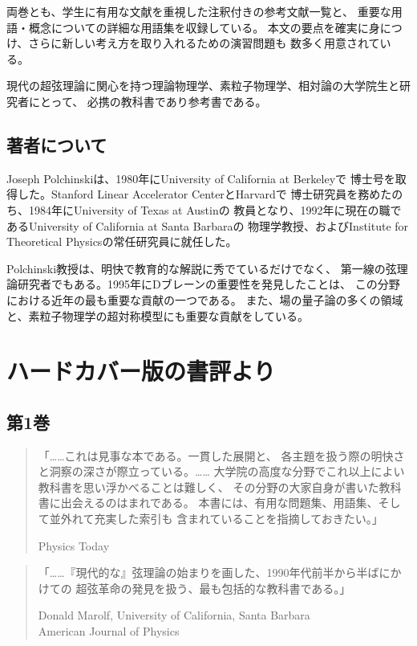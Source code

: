 両巻とも、学生に有用な文献を重視した注釈付きの参考文献一覧と、
重要な用語・概念についての詳細な用語集を収録している。
本文の要点を確実に身につけ、さらに新しい考え方を取り入れるための演習問題も
数多く用意されている。

現代の超弦理論に関心を持つ理論物理学、素粒子物理学、相対論の大学院生と研究者にとって、
必携の教科書であり参考書である。

\subsection*{著者について}
Joseph Polchinskiは、1980年にUniversity of California at Berkeleyで
博士号を取得した。Stanford Linear Accelerator CenterとHarvardで
博士研究員を務めたのち、1984年にUniversity of Texas at Austinの
教員となり、1992年に現在の職であるUniversity of California at Santa Barbaraの
物理学教授、およびInstitute for Theoretical Physicsの常任研究員に就任した。

Polchinski教授は、明快で教育的な解説に秀でているだけでなく、
第一線の弦理論研究者でもある。1995年にDブレーンの重要性を発見したことは、
この分野における近年の最も重要な貢献の一つである。
また、場の量子論の多くの領域と、素粒子物理学の超対称模型にも重要な貢献をしている。

\clearpage
\section*{ハードカバー版の書評より}
\subsection*{第1巻}
\begin{quote}
「……これは見事な本である。一貫した展開と、
各主題を扱う際の明快さと洞察の深さが際立っている。……
大学院の高度な分野でこれ以上によい教科書を思い浮かべることは難しく、
その分野の大家自身が書いた教科書に出会えるのはまれである。
本書には、有用な問題集、用語集、そして並外れて充実した索引も
含まれていることを指摘しておきたい。」
\begin{flushright}Physics Today\end{flushright}
\end{quote}

\begin{quote}
「……『現代的な』弦理論の始まりを画した、1990年代前半から半ばにかけての
超弦革命の発見を扱う、最も包括的な教科書である。」
\begin{flushright}
Donald Marolf, University of California, Santa Barbara\\
American Journal of Physics
\end{flushright}
\end{quote}

